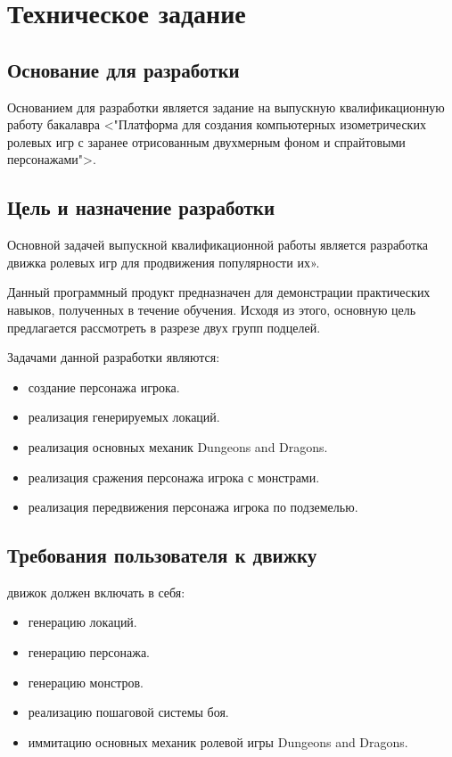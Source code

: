 \section{Техническое задание}
\subsection{Основание для разработки}

Основанием для разработки является задание на выпускную квалификационную работу бакалавра <"Платформа для создания компьютерных изометрических ролевых игр с заранее отрисованным двухмерным фоном и спрайтовыми персонажами">.

\subsection{Цель и назначение разработки}

Основной задачей выпускной квалификационной работы является разработка движка ролевых игр для продвижения популярности их».

 Данный программный продукт предназначен для демонстрации практических навыков, полученных в течение обучения. Исходя из этого, основную цель предлагается рассмотреть в разрезе двух групп подцелей.

Задачами данной разработки являются:
\begin{itemize}
\item создание персонажа игрока.
\item реализация генерируемых локаций.
\item реализация основных механик Dungeons and Dragons.
\item реализация сражения персонажа игрока с монстрами.
\item реализация передвижения персонажа игрока по подземелью.
\end{itemize}

\subsection{Требования пользователя к движку}

движок должен включать в себя:
\begin{itemize}
    \item генерацию локаций.
    \item генерацию персонажа.
    \item генерацию монстров.
    \item реализацию пошаговой системы боя.
    \item иммитацию основных механик ролевой игры Dungeons and Dragons.
\end{itemize}


